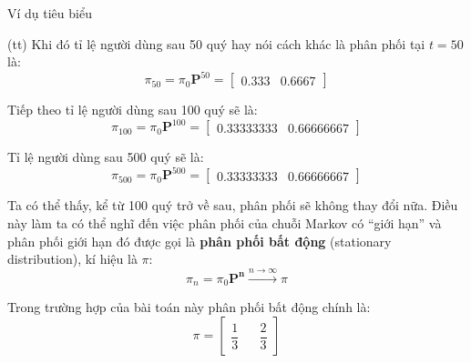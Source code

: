 \begin{frame}{Ví dụ tiêu biểu}
\begin{mysol*}{(tt)}
    \noindent Khi đó tỉ lệ người dùng sau 50 quý hay nói cách khác là phân phối tại $t = 50$ là:
$$
\pi_{50} = \pi_0 \mathbf{P}^{50} = 
\begin{bmatrix}
    0.333 & 0.6667
\end{bmatrix}
$$

\noindent Tiếp theo tỉ lệ người dùng sau 100 quý sẽ là:
$$
\pi_{100} = \pi_0 \mathbf{P}^{100} = \begin{bmatrix}
   0.33333333 & 0.66666667 
\end{bmatrix}
$$

\noindent Tỉ lệ người dùng sau 500 quý sẽ là:
$$
\pi_{500} = \pi_0 \mathbf{P}^{500} = \begin{bmatrix}
    0.33333333 & 0.66666667
\end{bmatrix}
$$
\end{mysol*}
\noindent Ta có thể thấy, kể từ 100 quý trở về sau, phân phối sẽ không thay đổi nữa. Điều này làm ta có thể nghĩ đến việc phân phối của chuỗi Markov có ``giới hạn'' và phân phối giới hạn đó được gọi là \textbf{phân phối bất động} (stationary distribution), kí hiệu là $\pi$:
$$
\pi_n = \pi_0 \mathbf{P^n} \xrightarrow{n \to \infty} \pi
$$

\noindent Trong trường hợp của bài toán này phân phối bất động chính là:
$$
\pi = \begin{bmatrix}
    \dfrac{1}{3} && \dfrac{2}{3}
\end{bmatrix}
$$
\end{frame}
